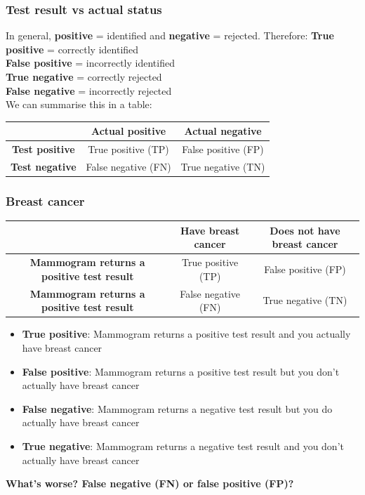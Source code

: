 \documentclass[a4paper]{article}
\begin{document}
\subsubsection{Test result vs actual status}
In general, \textbf{positive} = identified and \textbf{negative} = rejected. Therefore:
\textbf{True positive} = correctly identified \\
\textbf{False positive} = incorrectly identified \\
\textbf{True negative} = correctly rejected \\
\textbf{False negative} = incorrectly rejected \\
We can summarise this in a table:
\begin{table}[H]
	\centering
	\begin{tabular}{@{}c|cc@{}}
	\toprule
						   & \textbf{Actual positive} & \textbf{Actual negative} \\ \midrule
	\textbf{Test positive}  & True positive (TP)       & False positive (FP)      \\
	\textbf{Test negative} & False negative (FN)      & True negative (TN)       \\ \bottomrule
	\end{tabular}
\end{table}
\subsubsection{Breast cancer}
\begin{table}[H]
	\centering
	\begin{tabular}{@{}c|cc@{}}
	\toprule
						   & \textbf{Have breast cancer} & \textbf{Does not have breast cancer} \\ \midrule
	\textbf{Mammogram returns a positive test result} & True positive (TP)       & False positive (FP)      \\
	\textbf{Mammogram returns a positive test result} & False negative (FN)      & True negative (TN)       \\ \bottomrule
	\end{tabular}
\end{table}
\begin{itemize}
	\item \textbf{True positive}: Mammogram returns a positive test result and you actually have breast cancer
	\item \textbf{False positive}: Mammogram returns a positive test result but you don't actually have breast cancer
	\item \textbf{False negative}: Mammogram returns a negative test result but you do actually have breast cancer
	\item \textbf{True negative}: Mammogram returns a negative test result and you don't actually have breast cancer
\end{itemize}
\begin{greenbox}
	\textbf{What's worse? False negative (FN) or false positive (FP)?}
\end{greenbox}
\end{document}

